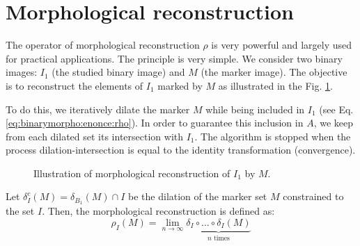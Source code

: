 \section{Morphological reconstruction}
The operator of morphological reconstruction $\rho$ is very powerful and largely used for practical applications.
The principle is very simple. We consider two binary images: $I_1$ (the studied binary image) and $M$ (the marker image).
The objective is to reconstruct the elements of $I_1$ marked by $M$ as illustrated in the Fig. \ref{fig:morpho:reconstruction}.

To do this, we iteratively dilate the marker $M$ while being included in $I_1$ (see Eq.\ref{eq:binarymorpho:enonce:rho}).
In order to guarantee this inclusion in $A$, we keep from each dilated set its intersection with $I_1$.
The algorithm is stopped when the process dilation-intersection is equal to the identity transformation (convergence).

\begin{figure}[htbp]
\centering\caption{Illustration of morphological reconstruction of $I_1$ by $M$.}%
\hspace{.5cm}
\hspace{.5cm}
%
\label{fig:morpho:reconstruction}%
\end{figure}

Let $\delta^c_I(M)= \delta_{B_1}(M) \cap I$ be the dilation of the marker set $M$ constrained to the set $I$. Then, the morphological reconstruction is defined as:
\begin{equation}\rho_I(M) = \lim_{n\rightarrow \infty} \underbrace{\delta_I \circ \ldots \circ \delta_I(M)}_{n \textrm{ times}}
 \label{eq:binarymorpho:enonce:rho}
\end{equation}



